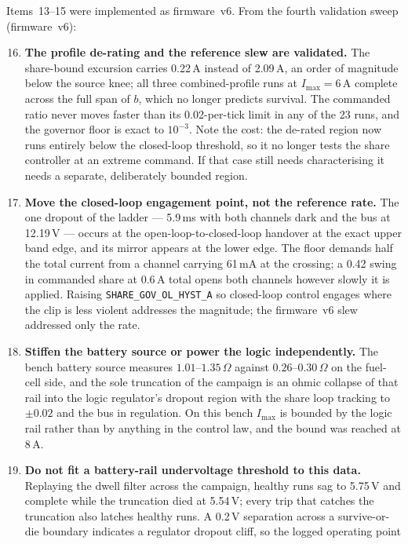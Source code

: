 \documentclass[11pt]{article}
\newcommand{\code}[1]{\texttt{#1}}
\begin{document}
Items~13--15 were implemented as firmware~v6. From the fourth validation sweep
(firmware~v6):

\begin{enumerate}
\setcounter{enumi}{15}
\item \textbf{The profile de-rating and the reference slew are validated.} The
share-bound excursion carries 0.22\,A instead of 2.09\,A, an order of magnitude
below the source knee; all three combined-profile runs at $I_\mathrm{max}=6$\,A
complete across the full span of $b$, which no longer predicts survival. The
commanded ratio never moves faster than its 0.02-per-tick limit in any of the 23
runs, and the governor floor is exact to $10^{-3}$. Note the cost: the de-rated
region now runs entirely below the closed-loop threshold, so it no longer tests
the share controller at an extreme command. If that case still needs
characterising it needs a separate, deliberately bounded region.
\item \textbf{Move the closed-loop engagement point, not the reference rate.} The
one dropout of the ladder --- 5.9\,ms with both channels dark and the bus at
12.19\,V --- occurs at the open-loop-to-closed-loop handover at the exact upper
band edge, and its mirror appears at the lower edge. The floor demands half the
total current from a channel carrying 61\,mA at the crossing; a 0.42 swing in
commanded share at 0.6\,A total opens both channels however slowly it is applied.
Raising \code{SHARE\_GOV\_OL\_HYST\_A} so closed-loop control engages where the
clip is less violent addresses the magnitude; the firmware~v6 slew addressed only
the rate.
\item \textbf{Stiffen the battery source or power the logic independently.} The
bench battery source measures $1.01$--$1.35\,\Omega$ against $0.26$--$0.30\,\Omega$
on the fuel-cell side, and the sole truncation of the campaign is an ohmic
collapse of that rail into the logic regulator's dropout region with the share
loop tracking to $\pm0.02$ and the bus in regulation. On this bench
$I_\mathrm{max}$ is bounded by the logic rail rather than by anything in the
control law, and the bound was reached at 8\,A.
\item \textbf{Do not fit a battery-rail undervoltage threshold to this data.}
Replaying the dwell filter across the campaign, healthy runs sag to 5.75\,V and
complete while the truncation died at 5.54\,V; every trip that catches the
truncation also latches healthy runs. A 0.2\,V separation across a survive-or-die
boundary indicates a regulator dropout cliff, so the logged operating point

\end{enumerate}
\end{document}
